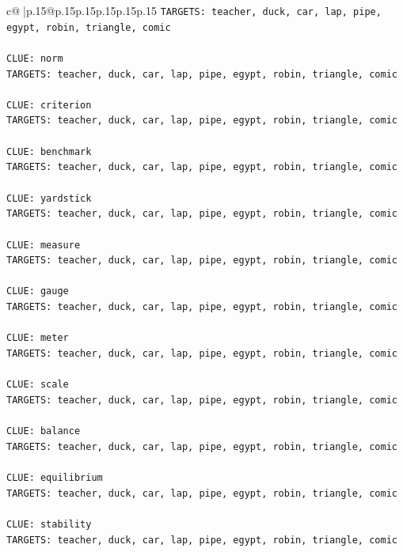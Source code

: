 \documentclass{article}
\begin{document}
{\begin{supertabular}{c@{$\;$}|p{.15\linewidth}@{}p{.15\linewidth}p{.15\linewidth}p{.15\linewidth}p{.15\linewidth}p{.15\linewidth}}
{{{\texttt{TARGETS: teacher, duck, car, lap, pipe, egypt, robin, triangle, comic} \\
\\ 
\texttt{CLUE: norm} \\
\texttt{TARGETS: teacher, duck, car, lap, pipe, egypt, robin, triangle, comic} \\
\\ 
\texttt{CLUE: criterion} \\
\texttt{TARGETS: teacher, duck, car, lap, pipe, egypt, robin, triangle, comic} \\
\\ 
\texttt{CLUE: benchmark} \\
\texttt{TARGETS: teacher, duck, car, lap, pipe, egypt, robin, triangle, comic} \\
\\ 
\texttt{CLUE: yardstick} \\
\texttt{TARGETS: teacher, duck, car, lap, pipe, egypt, robin, triangle, comic} \\
\\ 
\texttt{CLUE: measure} \\
\texttt{TARGETS: teacher, duck, car, lap, pipe, egypt, robin, triangle, comic} \\
\\ 
\texttt{CLUE: gauge} \\
\texttt{TARGETS: teacher, duck, car, lap, pipe, egypt, robin, triangle, comic} \\
\\ 
\texttt{CLUE: meter} \\
\texttt{TARGETS: teacher, duck, car, lap, pipe, egypt, robin, triangle, comic} \\
\\ 
\texttt{CLUE: scale} \\
\texttt{TARGETS: teacher, duck, car, lap, pipe, egypt, robin, triangle, comic} \\
\\ 
\texttt{CLUE: balance} \\
\texttt{TARGETS: teacher, duck, car, lap, pipe, egypt, robin, triangle, comic} \\
\\ 
\texttt{CLUE: equilibrium} \\
\texttt{TARGETS: teacher, duck, car, lap, pipe, egypt, robin, triangle, comic} \\
\\ 
\texttt{CLUE: stability} \\
\texttt{TARGETS: teacher, duck, car, lap, pipe, egypt, robin, triangle, comic} \\
}}}
\end{supertabular}}
\end{document}
